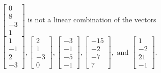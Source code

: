 \begin{exercise}
\begin{exerciseStatement}
  \end{exerciseStatement}
  \begin{exerciseAnswer}
   \(\left[\begin{array}{c}
0 \\
8 \\
-3 \\
1
\end{array}\right]\) 
  	 is not  
	a linear combination of the vectors \(\left[\begin{array}{c}
1 \\
-1 \\
2 \\
-3
\end{array}\right] , \left[\begin{array}{c}
2 \\
1 \\
-3 \\
0
\end{array}\right] , \left[\begin{array}{c}
-3 \\
-1 \\
-5 \\
-1
\end{array}\right] , \left[\begin{array}{c}
-15 \\
-2 \\
-7 \\
7
\end{array}\right] , \text{ and } \left[\begin{array}{c}
1 \\
-2 \\
21 \\
-1
\end{array}\right]\).

	
  


  \end{exerciseAnswer}
\end{exercise}